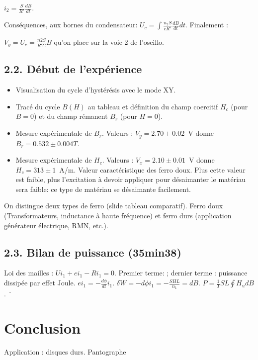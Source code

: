\documentclass[french, a4paper, 10pt, twocolumn, landscape]{article}
\begin{document}
$i_2 = \frac{S}{R'} \frac{d B}{d t}$.

Conséquences, aux bornes du condensateur: $U_c = \int \frac{n_2 S}{c R'} \frac{d B}{d t} d t$. Finalement :

$V_y = U_c = \frac{n2 S}{R' C} B$ qu'on place sur la voie 2 de l'oscillo.

\subsection*{2.2. Début de l'expérience}

\begin{itemize}
    \item Visualisation du cycle d'hystérésis avec le mode XY.
    \item Tracé du cycle $B(H)$ au tableau et définition du champ coercitif $H_c$ (pour $B=0$) et du champ rémanent $B_r$ (pour $H=0$).
    \item Mesure expérimentale de $B_r$. Valeurs : $V_y = 2.70 \pm 0.02$~V donne $B_r = 0.532 \pm 0.004 T$. 
    \item Mesure expérimentale de $H_c$. Valeurs : $V_x = 2.10 \pm 0.01$~V donne $H_c = 313 \pm 1$~A/m. Valeur caractéristique des ferro doux. Plus cette valeur est faible, plus l'excitation à devoir appliquer pour désaimanter le matériau sera faible: ce type de matériau se désaimante facilement.  
\end{itemize}

On distingue deux types de ferro (slide tableau comparatif). Ferro doux (Transformateurs, inductance à haute fréquence) et ferro durs (application générateur électrique, RMN, etc.).

\subsection*{2.3. Bilan de puissance (35min38)}

Loi des mailles : $U i_1 + e i_1 - R i_1 = 0$. Premier terme: ; dernier terme : puissance dissipée par effet Joule. $e i_1 = - \frac{d \phi}{d t} i_1$. $\delta W = - d \phi i_1 = - \frac{SHL}{n_1} = d B$. $P = \frac{1}{T} SL \oint H _ud B$. ¨

\section*{Conclusion}

Application : disques durs. Pantographe
\end{document}
